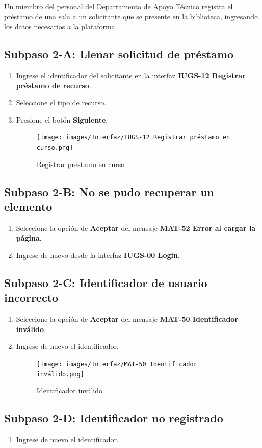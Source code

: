 Un miembro del personal del Departamento de Apoyo Técnico registra el préstamo de una sala a un solicitante que se presente en la biblioteca, ingresando los datos necesarios a la plataforma.

\subsection{Subpaso 2-A: Llenar solicitud de préstamo}
\begin{enumerate}
	\item Ingrese el identificador del solicitante en la interfaz
    \textbf{IUGS-12 Registrar préstamo de recurso}.
\item Seleccione el tipo de recurso.
\item Presione el botón \textbf{Siguiente}.
	  \begin{figure}[hbtp]
	\texttt{[image: images/Interfaz/IUGS-12 Registrar préstamo en curso.png]}
	\caption{Registrar préstamo en curso}
	\end{figure}
\end{enumerate}

\subsection{Subpaso 2-B: No se pudo recuperar un elemento}
\begin{enumerate}
	\item Seleccione la opción de \textbf{Aceptar} del mensaje
\textbf{MAT-52 Error al cargar la página}.
	\item Ingrese de nuevo desde la interfaz 
\textbf{IUGS-00 Login}.
\end{enumerate}

\subsection{Subpaso 2-C: Identificador de usuario incorrecto}
\begin{enumerate}
	\item Seleccione la opción de \textbf{Aceptar} del mensaje
\textbf{MAT-50 Identificador inválido}.
	\item Ingrese de nuevo el identificador.
	\begin{figure}[hbtp]
	\texttt{[image: images/Interfaz/MAT-50 Identificador inválido.png]}
	\caption{Identificador inválido}
	\end{figure}
\end{enumerate}

\subsection{Subpaso 2-D: Identificador no registrado}
\begin{enumerate}
	\item Ingrese de nuevo el identificador.
\end{enumerate}

